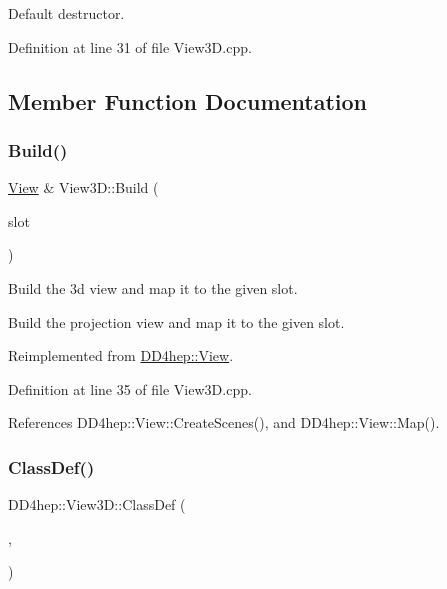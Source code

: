 Default destructor. 



Definition at line 31 of file View3\+D.\+cpp.



\subsection{Member Function Documentation}
\hypertarget{class_d_d4hep_1_1_view3_d_a8067ea1bbbbcf503e271acd7dcace79f}{}\label{class_d_d4hep_1_1_view3_d_a8067ea1bbbbcf503e271acd7dcace79f} 
\subsubsection{\texorpdfstring{Build()}{Build()}}
{\footnotesize\ttfamily \hyperlink{class_d_d4hep_1_1_view}{View} \& View3\+D\+::\+Build (\begin{DoxyParamCaption}\item[{T\+Eve\+Window $\ast$}]{slot }\end{DoxyParamCaption})\hspace{0.3cm}{\ttfamily [virtual]}}



Build the 3d view and map it to the given slot. 

Build the projection view and map it to the given slot. 

Reimplemented from \hyperlink{class_d_d4hep_1_1_view_ab4e12874a9cb6a599f268b027443c6ce}{D\+D4hep\+::\+View}.



Definition at line 35 of file View3\+D.\+cpp.



References D\+D4hep\+::\+View\+::\+Create\+Scenes(), and D\+D4hep\+::\+View\+::\+Map().

\hypertarget{class_d_d4hep_1_1_view3_d_af7a20e27b1a1a86cd76af61d17167172}{}\label{class_d_d4hep_1_1_view3_d_af7a20e27b1a1a86cd76af61d17167172} 
\subsubsection{\texorpdfstring{Class\+Def()}{ClassDef()}}
{\footnotesize\ttfamily D\+D4hep\+::\+View3\+D\+::\+Class\+Def (\begin{DoxyParamCaption}\item[{\hyperlink{class_d_d4hep_1_1_view3_d}{View3D}}]{,  }\item[{0}]{ }\end{DoxyParamCaption})}



